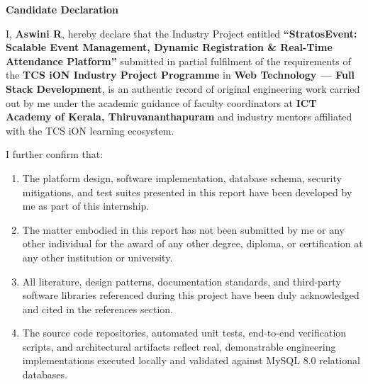 \documentclass[11pt,a4paper]{report}
\begin{document}
\newpage
\thispagestyle{plain}

\vspace*{0.3in}

\begin{center}
  {\color{TitleBlue}\bfseries\fontsize{18}{22}\selectfont Candidate Declaration\par}
\end{center}

\vspace{0.3in}

\noindent
I, \textbf{Aswini R}, hereby declare that the Industry Project entitled \textbf{``StratosEvent: Scalable Event Management, Dynamic Registration \& Real-Time Attendance Platform''} submitted in partial fulfilment of the requirements of the \textbf{TCS iON Industry Project Programme} in \textbf{Web Technology --- Full Stack Development}, is an authentic record of original engineering work carried out by me under the academic guidance of faculty coordinators at \textbf{ICT Academy of Kerala, Thiruvananthapuram} and industry mentors affiliated with the TCS iON learning ecosystem.

\vspace{0.2in}
\noindent
I further confirm that:
\begin{enumerate}[leftmargin=1.5em, itemsep=0.8em]
    \item The platform design, software implementation, database schema, security mitigations, and test suites presented in this report have been developed by me as part of this internship.
    \item The matter embodied in this report has not been submitted by me or any other individual for the award of any other degree, diploma, or certification at any other institution or university.
    \item All literature, design patterns, documentation standards, and third-party software libraries referenced during this project have been duly acknowledged and cited in the references section.
    \item The source code repositories, automated unit tests, end-to-end verification scripts, and architectural artifacts reflect real, demonstrable engineering implementations executed locally and validated against MySQL 8.0 relational databases.
\end{enumerate}

\vspace{0.6in}
\end{document}
